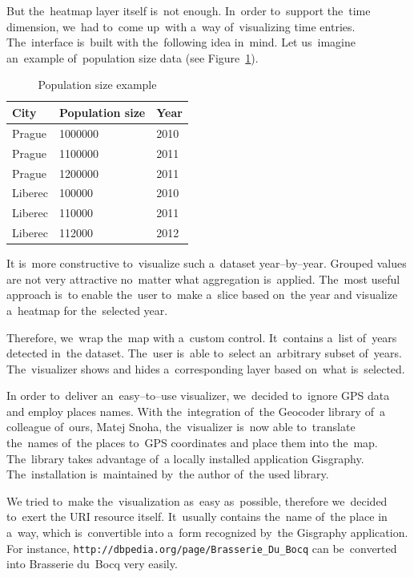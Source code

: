 But the~heatmap layer itself is~not enough. In~order to~support the~time 
dimension, we~had to~come up~with a~way of~visualizing time entries. The~interface is~built with the~following idea in~mind. Let us~imagine an~example of~population size data (see Figure~\ref{fig:impl-pop-ex}).

\begin{table}
  \begin{center}
\begin{tabular}{l|l|l}
  City & Population size & Year \\ \hline
  Prague   &    1000000   &   2010 \\
  Prague   &    1100000   &   2011 \\
  Prague   &    1200000   &   2011 \\
  Liberec   &    100000    &  2010 \\
  Liberec   &    110000    &  2011 \\
  Liberec    &   112000    &  2012
\end{tabular}
\caption{Population size example}
\label{fig:impl-pop-ex}
  \end{center}
\end{table}

It is~more constructive to~visualize such a~dataset year--by--year. Grouped values are 
not very attractive no~matter what aggregation is~applied. The~most useful 
approach is~to enable the~user to~make a~slice based on~the year and visualize a~heatmap for the~selected year.

Therefore, we~wrap the~map with a~custom control. It~contains a~list of~years 
detected in~the dataset. The~user is~able to~select an~arbitrary subset of~years. The~visualizer shows and hides a~corresponding layer based on~what is~selected. 

In order to~deliver an~easy--to--use visualizer, we~decided to~ignore GPS 
data and employ places names. With the~integration of~the Geocoder library of~a 
colleague of~ours, Matej Snoha, the~visualizer is~now able to~translate the~names of~the places to~GPS coordinates and place them into the~map. The~library takes 
advantage of~a locally installed application Gisgraphy. The~installation is~maintained by~the author of~the used library.

We tried to~make the~visualization as~easy as~possible, therefore we~decided to~exert the
URI resource itself. It~usually contains the~name of~the place 
in a~way, which is~convertible into a~form recognized by~the Gisgraphy 
application. For instance, \texttt{http://dbpedia.org/page/Brasserie\_Du\_Bocq} 
can be~converted into Brasserie du~Bocq very easily.


